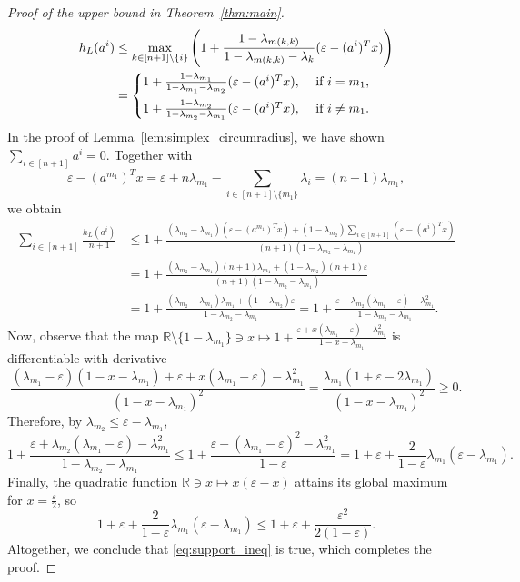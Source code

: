 \documentclass{amsart}
\newcommand\R{\mathbb{R}}
\begin{document}
\begin{proof}[Proof of the upper bound in Theorem~\ref{thm:main}]
\begin{align*}
	h_L(a^i)
	& \leq \max_{k \in [n+1] \setminus \{i\}} \Bigg( 1 + \frac{1 - \lambda_{m(k,k)}}{1 - \lambda_{m(k,k)} - \lambda_k} ( \varepsilon - (a^i)^T x ) \Bigg)
    \\
	& = \begin{cases}
		1 + \frac{1 - \lambda_{m_1}}{1 - \lambda_{m_1} - \lambda_{m_2}} ( \varepsilon - (a^i)^T x ), & \text{ if } i = m_1,
        \vspace{5pt} \\
		1 + \frac{1 - \lambda_{m_2}}{1 - \lambda_{m_2} - \lambda_{m_1}} ( \varepsilon - (a^i)^T x ), & \text{ if } i \neq m_1.
	\end{cases}
\end{align*}
In the proof of Lemma~\ref{lem:simplex_circumradius}, we have shown $\sum_{i \in [n+1]} a^i = 0$. Together with
\[
    \varepsilon - (a^{m_1})^T x = \varepsilon + n \lambda_{m_1} - \sum_{i \in [n+1] \setminus \{m_1\}} \lambda_i = (n+1) \lambda_{m_1},
\]
we obtain
\begin{align*}
	\sum_{i \in [n+1]} \frac{h_L(a^i)}{n+1}
	& \leq 1 + \frac{(\lambda_{m_2} - \lambda_{m_1}) (\varepsilon - (a^{m_1})^T x) + (1 - \lambda_{m_2}) \sum_{i \in [n+1]} (\varepsilon - (a^i)^T x)}{(n+1) (1 - \lambda_{m_2} - \lambda_{m_1})}
    \\
	& = 1 + \frac{(\lambda_{m_2} - \lambda_{m_1}) (n+1) \lambda_{m_1} + (1 - \lambda_{m_2}) (n+1) \varepsilon}{(n+1) (1 - \lambda_{m_2} - \lambda_{m_1})}
    \\
	& = 1 + \frac{(\lambda_{m_2} - \lambda_{m_1}) \lambda_{m_1} + (1 - \lambda_{m_2}) \varepsilon}{1 - \lambda_{m_2} - \lambda_{m_1}}
	= 1 + \frac{\varepsilon + \lambda_{m_2} (\lambda_{m_1} - \varepsilon) - \lambda_{m_1}^2}{1 - \lambda_{m_2} - \lambda_{m_1}}.
\end{align*}
Now, observe that the map
$\R \setminus \{1 - \lambda_{m_1}\} \ni x \mapsto 1 + \frac{\varepsilon + x (\lambda_{m_1} - \varepsilon) - \lambda_{m_1}^2}{1 - x - \lambda_{m_1}}$
is differentiable with derivative
\[
	\frac{(\lambda_{m_1} - \varepsilon) (1 - x - \lambda_{m_1}) + \varepsilon + x (\lambda_{m_1} - \varepsilon) - \lambda_{m_1}^2}
			{(1 - x - \lambda_{m_1})^2}
		= \frac{\lambda_{m_1} (1 + \varepsilon - 2 \lambda_{m_1})}{(1 - x - \lambda_{m_1})^2}
		\geq 0.
\]
Therefore, by $\lambda_{m_2} \leq \varepsilon - \lambda_{m_1}$,
\[
	1 + \frac{\varepsilon + \lambda_{m_2} (\lambda_{m_1} - \varepsilon) - \lambda_{m_1}^2}{1 - \lambda_{m_2} - \lambda_{m_1}}
		\leq 1 + \frac{\varepsilon - (\lambda_{m_1} - \varepsilon)^2 - \lambda_{m_1}^2}{1 - \varepsilon}
		= 1 + \varepsilon + \frac{2}{1 - \varepsilon} \lambda_{m_1} (\varepsilon - \lambda_{m_1}).
\]
Finally, the quadratic function $\R \ni x \mapsto x (\varepsilon - x)$ attains its global maximum for $x = \frac{\varepsilon}{2}$, so
\[
	1 + \varepsilon + \frac{2}{1 - \varepsilon} \lambda_{m_1} (\varepsilon - \lambda_{m_1})
		\leq 1 + \varepsilon + \frac{\varepsilon^2}{2 (1 - \varepsilon)}.
\]
Altogether, we conclude that \eqref{eq:support_ineq} is true,
which completes the proof.
\end{proof}
\end{document}

